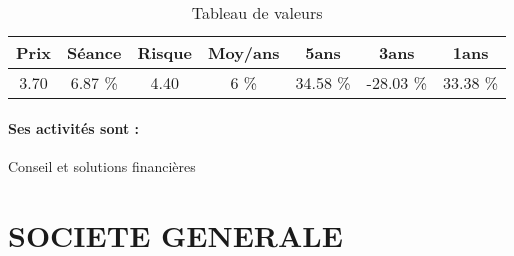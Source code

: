 \documentclass[11pt,a4paper]{report}%
\begin{document}
\begin{table}[H]
  \centering
    \begin{tabular}{|c|c|c|c|c|c|c|}
    \hline
    Prix & Séance & Risque  & Moy/ans & 5ans & 3ans & 1ans \\
    \hline
    3.70 &    6.87 \%    & 4.40 & 6 \% & 34.58 \% & -28.03 \% & 33.38 \% \\
    \hline
    \end{tabular}%
        \label{tab:table_NATIXIS}%
      \caption{Tableau de valeurs}
\end{table}%

\paragraph{Ses activités sont : } Conseil et solutions financières  
    
    \newpage

\section{SOCIETE GENERALE}
\end{document}
